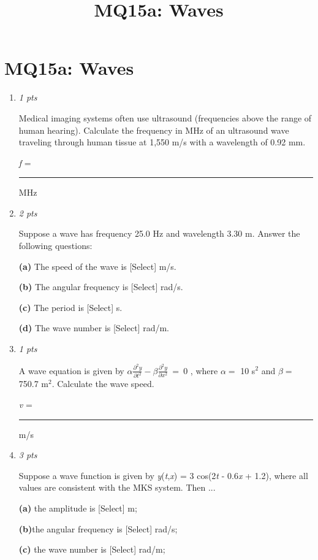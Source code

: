 \documentclass[11pt]{article}
\title{MQ15a: Waves}
\author{}
\date{}
\begin{document}
\maketitle

\section*{MQ15a: Waves}

\begin{enumerate}[leftmargin=*,label=\textbf{Question \arabic*.}]
\item \hfill \textit{1 pts}

Medical imaging systems often use ultrasound (frequencies above the range of human hearing). Calculate the frequency in MHz of an ultrasound wave traveling through human tissue at 1,550 m/s with a wavelength of 0.92 mm.



\emph{f} = \rule{2cm}{0.4pt} MHz

\item \hfill \textit{2 pts}

Suppose a wave has frequency 25.0 Hz and wavelength 3.30 m. Answer the following questions:

\textbf{(a) }The speed of the wave is [Select]
 m/s.

\textbf{(b)} The angular frequency is [Select]
 rad/s.

\textbf{(c)} The period is [Select]
 s.

\textbf{(d)} The wave number is [Select]
 rad/m.

\item \hfill \textit{1 pts}

A wave equation is given by $\alpha\frac{\partial^2y}{\partial t^2}-\beta\frac{\partial^2y}{\partial x^2}\:=\:0$ , where $\alpha=$ 10 s$^{2}$ and $\beta=$ 750.7 m$^{2}$. Calculate the wave speed.



\emph{v } = \rule{2cm}{0.4pt} m/s

\item \hfill \textit{3 pts}

Suppose a wave function is given by \emph{y}(\emph{t},\emph{x}) = 3 cos(2\emph{t }- 0.6\emph{x} + 1.2), where all values are consistent with the MKS system. Then ...

\textbf{(a)} the amplitude is [Select]
 m;

\textbf{(b)}the angular frequency is [Select]
 rad/s;

\textbf{(c)} the wave number is [Select]
 rad/m;


\end{enumerate}
\end{document}
